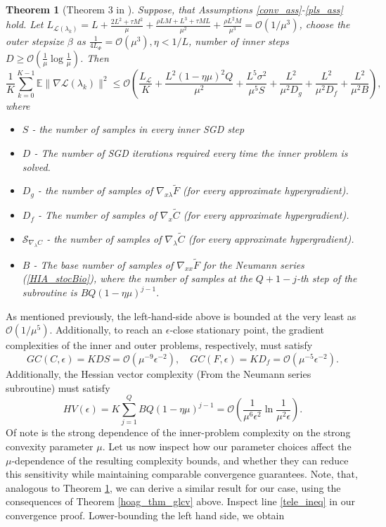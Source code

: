 \documentclass[11pt, twoside]{report}
\newtheorem{theorem}{Theorem}[section]
\begin{document}
\begin{theorem}[Theorem 3 in \cite{ji2021bilevel}] \label{thm3}
    Suppose, that Assumptions \ref{conv_ass}-\ref{pls_ass} hold. Let $L_{\mathcal{L}(\lambda_k)} = L + \frac{2L^2 + \tau M^2}{\mu} + \frac{\rho L M + L^3 + \tau M L}{\mu^2} + \frac{\rho L^2 M}{\mu^3} = \mathcal{O}(1/\mu^3)$, choose the outer stepsize $\beta$ as $\frac{1}{4 L_\Phi} = \mathcal{O}(\mu^3), \eta < 1/L$, number of inner steps $D \geq \mathcal{O}(\frac{1}{\mu} \log{\frac{1}{\mu}})$. Then
    \[\frac{1}{K} \sum_{k=0}^{K-1} \mathbb{E} \|\nabla \mathcal{L} (\lambda_k)\|^2 \leq \mathcal{O}\left( \frac{L_{\mathcal{L}}}{K} + \frac{L^2(1-\eta \mu)^2Q}{\mu^2} + \frac{L^5 \sigma^2}{\mu^5 S} + \frac{L^2}{\mu^2 D_g} + \frac{L^2}{\mu^2 D_f} + \frac{L^2}{
    \mu^2 B} \right),\]
    where
    \begin{itemize}
        \item $S$ - the number of samples in every inner SGD step
        \item $D$ - The number of SGD iterations required every time the inner problem is solved.
        \item $D_g$ - the number of samples of $\nabla_{x\lambda} \tilde{F}$ (for every approximate hypergradient).
        \item $D_f$ - The number of samples of $\nabla_x \tilde{C}$ (for every approximate hypergradient).
        \item $\mathcal{S}_{\nabla_\lambda C}$ - the number of samples of $\nabla_{\lambda} \tilde{C}$ (for every approximate hypergradient).
        \item $B$ - The base number of samples of $\nabla_{xx} \tilde{F}$ for the Neumann series (\ref{HIA_stocBio}), where the number of samples at the $Q+1-j$-th step of the subroutine is $BQ(1-\eta\mu)^{j-1}.$
    \end{itemize}
\end{theorem}
As mentioned previously, the left-hand-side above is bounded at the very least as $\mathcal{O}(1 / \mu^5)$. Additionally, to reach an $\epsilon$-close stationary point, the gradient complexities of the inner and outer problems, respectively, must satisfy
\[GC(C,\epsilon) = KDS = \mathcal{O}(\mu^{-9} \epsilon^{-2}), \quad GC(F,\epsilon) = KD_f = \mathcal{O} (\mu^{-5} \epsilon^{-2}). \]
Additionally, the Hessian vector complexity (From the Neumann series subroutine) must satisfy
\[HV(\epsilon) = K \sum_{j=1}^Q B Q(1-\eta \mu)^{j-1} = \mathcal{O}\left(\frac{1}{\mu^6\epsilon^2} \ln \frac{1}{\mu^2\epsilon}\right).\]
Of note is the strong dependence of the inner-problem complexity on the strong convexity parameter $\mu$. Let us now inspect how our parameter choices affect the $\mu$-dependence of the resulting complexity bounds, and whether they can reduce this sensitivity while maintaining comparable convergence guarantees. Note, that, analogous to Theorem \ref{thm3}, we can derive a similar result for our case, using the consequences of Theorem \ref{hoag_thm_glcv} above. Inspect line \ref{tele_ineq} in our convergence proof. Lower-bounding the left hand side, we obtain
\end{document}
